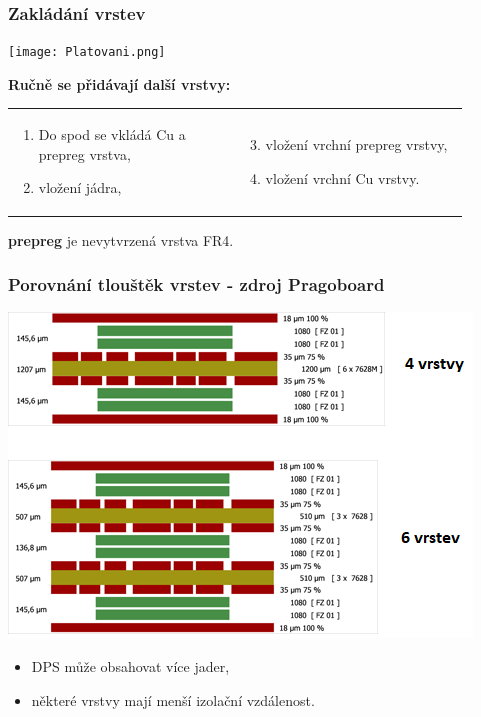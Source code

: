 \documentclass{beamer}
\begin{document}
\begin{frame}
	\frametitle{Zakládání vrstev}

	\begin{center}
		\texttt{[image: Platovani.png]}
	\end{center}
	\begin{flushleft}
		\textbf{Ručně se přidávají další vrstvy:}
	\end{flushleft}
	\begin{center}
		\begin{tabular}{p{0.45\linewidth} p{0.45\linewidth}}
		
		\begin{enumerate}
			\setcounter{enumi}{0}
			\item Do spod se vkládá Cu a prepreg vrstva,
			\item vložení jádra,
		\end{enumerate}
		&
		\begin{enumerate}
			\setcounter{enumi}{2}
			\item vložení vrchní prepreg vrstvy,
			\item vložení vrchní Cu vrstvy.
		\end{enumerate}
		\end{tabular}
		\small
		\textbf{prepreg} je nevytvrzená vrstva FR4.
	\end{center}
\end{frame}
\begin{frame}
	\frametitle{Porovnání tlouštěk vrstev - zdroj Pragoboard}

	\begin{center}
		\includegraphics[scale=0.8]{pragoboard.png}
	\end{center}
	
	
	\begin{itemize}
		\item DPS může obsahovat více jader,
		\item některé vrstvy mají menší izolační vzdálenost.
	\end{itemize}
	
\end{frame}
\end{document}
